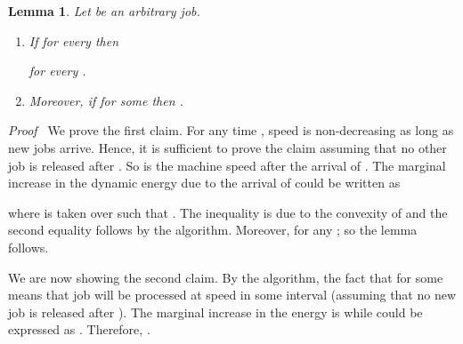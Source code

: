 \documentclass[11pt]{article}
\newenvironment{proof}{\noindent\emph{Proof\ }}{\hspace*{\fill}\medskip}
\newtheorem{lemma}{Lemma}
\begin{document}
\begin{lemma}		\label{lem:general-energy}
Let  be an arbitrary job. 
\begin{enumerate}
	\item If  for every  then
	 
	for every .
	\item Moreover, if 
	 for some  then .
\end{enumerate}
\end{lemma}
\begin{proof}
We prove the first claim.
For any time , speed  is non-decreasing as long as new jobs arrive. Hence,
it is sufficient to prove the claim assuming that no other job is released after . So
 is the machine speed after the arrival of . The marginal increase in the dynamic energy 
due to the arrival of  could be written as 

where  is taken over  such that .
The inequality is due to the convexity of  and the second equality follows by the algorithm. 
Moreover,  for any ; so the lemma 
follows. 

We are now showing the second claim. 
By the algorithm, the fact that  for some  means that
job  will be processed at speed  in some interval 
(assuming that no new job is released after ).  
The marginal increase in the energy is  while  could be expressed 
as . Therefore, .
\end{proof}
\end{document}
